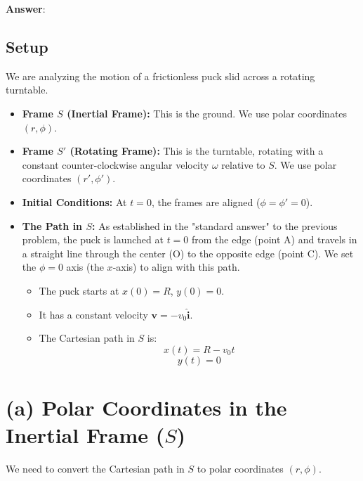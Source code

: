\documentclass[11pt, a4paper]{article} %
\begin{document}
\textbf{Answer}:

\subsection*{Setup}
We are analyzing the motion of a frictionless puck slid across a rotating turntable.

\begin{itemize}
    \item \textbf{Frame $S$ (Inertial Frame):} This is the ground. We use polar coordinates $(r, \phi)$.
    \item \textbf{Frame $S'$ (Rotating Frame):} This is the turntable, rotating with a constant counter-clockwise angular velocity $\omega$ relative to $S$. We use polar coordinates $(r', \phi')$.
    \item \textbf{Initial Conditions:} At $t=0$, the frames are aligned ($\phi = \phi' = 0$).
    \item \textbf{The Path in $S$:} As established in the "standard answer" to the previous problem, the puck is launched at $t=0$ from the edge (point A) and travels in a straight line through the center (O) to the opposite edge (point C). We set the $\phi=0$ axis (the $x$-axis) to align with this path.
    \begin{itemize}
        \item The puck starts at $x(0) = R$, $y(0) = 0$.
        \item It has a constant velocity $\mathbf{v} = -v_0 \hat{\mathbf{i}}$.
        \item The Cartesian path in $S$ is:
        $$x(t) = R - v_0 t$$
        $$y(t) = 0$$
    \end{itemize}
\end{itemize}

\hrulefill

\section*{(a) Polar Coordinates in the Inertial Frame ($S$)}

We need to convert the Cartesian path in $S$ to polar coordinates $(r, \phi)$.
\end{document}

